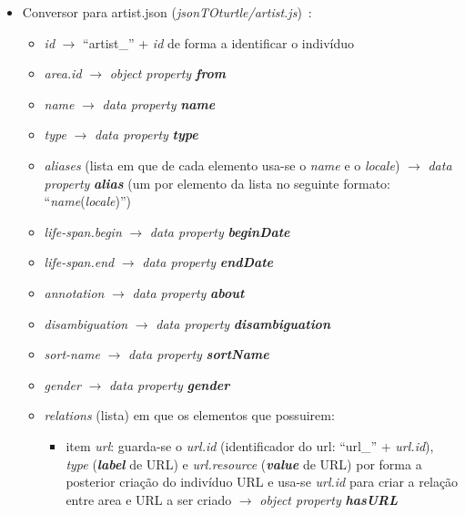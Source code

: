 \documentclass{article}
\begin{document}
\begin{itemize}
\begin{itemize}
\begin{itemize}
                \end{itemize}
        \end{itemize}
    \item Conversor para artist.json (\textit{jsonTOturtle/artist.js})~\cite{mbArt}:
        \begin{itemize}
            \item \textit{id} $\to$ ``artist\_'' + \textit{id} de forma a identificar o indivíduo
            \item \textit{area.id} $\to$ \textit{object property} \textit{\textbf{from}}
            \item \textit{name} $\to$ \textit{data property} \textit{\textbf{name}}
            \item \textit{type} $\to$ \textit{data property} \textit{\textbf{type}}
            \item \textit{aliases} (lista em que de cada elemento usa-se o \textit{name} e o \textit{locale}) $\to$ \textit{data property} \textit{\textbf{alias}} (um por elemento da lista no seguinte formato: ``\textit{name}(\textit{locale})'')
            \item \textit{life-span.begin} $\to$ \textit{data property} \textit{\textbf{beginDate}}
            \item \textit{life-span.end} $\to$ \textit{data property} \textit{\textbf{endDate}}
            \item \textit{annotation} $\to$ \textit{data property} \textit{\textbf{about}}
            \item \textit{disambiguation} $\to$ \textit{data property} \textit{\textbf{disambiguation}}
            \item \textit{sort-name} $\to$ \textit{data property} \textit{\textbf{sortName}}
            \item \textit{gender} $\to$ \textit{data property} \textit{\textbf{gender}}
            \item \textit{relations} (lista) em que os elementos que possuirem:
                \begin{itemize}
                    \item item \textit{url}: guarda-se o \textit{url.id} (identificador do url: ``url\_'' + \textit{url.id}), \textit{type} (\textit{\textbf{label}} de URL) e \textit{url.resource} (\textit{\textbf{value}} de URL) por forma a posterior criação do indivíduo URL e usa-se \textit{url.id} para criar a relação entre area e URL a ser criado $\to$ \textit{object property} \textit{\textbf{hasURL}}
                \end{itemize}

\end{itemize}
\end{itemize}
\end{document}
